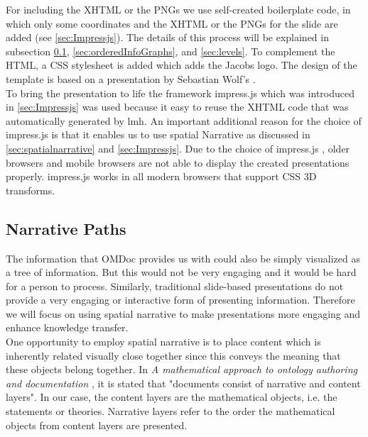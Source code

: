 \documentclass[twoside, 12pt]{article}
\begin{document}
For including the XHTML or the PNGs we use self-created boilerplate code, in which only some coordinates and the XHTML or the PNGs for the slide are added (see \autoref{sec:Impressjs}). The details of this process will be explained in subsection \ref{sec:narrativePaths}, \ref{sec:orderedInfoGraphs}, and \ref{sec:levels}. To complement the HTML, a CSS stylesheet is added which adds the Jacobs logo. The design of the template is based on a presentation by Sebastian Wolf's \cite{Wolf:npentrel15}.\\

To bring the presentation to life the framework impress.js which was introduced in \autoref{sec:Impressjs} was used because it easy to reuse the XHTML code that was automatically generated by lmh. An important additional reason for the choice of impress.js is that it enables us to use spatial Narrative as discussed in \autoref{sec:spatialnarrative} and \autoref{sec:Impressjs}. Due to the choice of impress.js \cite{JSImpress:npentrel14}, older browsers and mobile browsers are not able to display the created presentations properly. impress.js works in all modern browsers that support CSS 3D transforms.\\

\subsection{Narrative Paths}
\label{sec:narrativePaths}

The information that OMDoc provides us with could also be simply visualized as a tree of information. But this would not be very engaging and it would be hard for a person to process. Similarly, traditional slide-based presentations do not provide a very engaging or interactive form of presenting information. Therefore we will focus on using spatial narrative to make presentations more engaging and enhance knowledge transfer.\\ 

One opportunity to employ spatial narrative is to place content which is inherently related visually close together since this conveys the meaning that these objects belong together. In \textit{A mathematical approach to ontology authoring and documentation} \cite{LK:MathOntoAuthDoc09}, it is stated that "documents consist of narrative and content layers". In our case, the content layers are the mathematical objects, i.e. the statements or theories. Narrative layers refer to the order the mathematical objects from content layers are presented.\\
\end{document}
